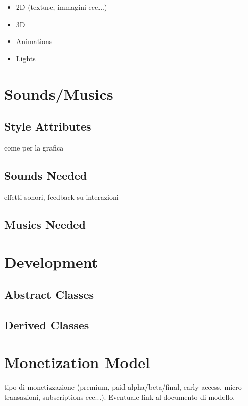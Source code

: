 \documentclass[a4paper]{scrreprt}
\begin{document}
\begin{itemize}
\item 2D (texture, immagini ecc...)
\item 3D
\item Animations
\item Lights
\end{itemize}


\chapter{Sounds/Musics}

\section{Style Attributes}
come per la grafica

\section{Sounds Needed}
effetti sonori, feedback su interazioni

\section{Musics Needed}


\chapter{Development}

\section{Abstract Classes}

\section{Derived Classes}


\chapter{Monetization Model}
tipo di monetizzazione (premium, paid alpha/beta/final, early access, micro-transazioni, subscriptions ecc...). Eventuale link al documento di modello.
\end{document}
